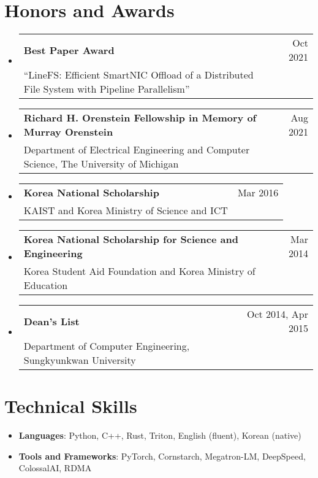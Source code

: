 \documentclass[letterpaper,oneside,11pt]{article}
\makeatletter
\newcommand{\resumeItem}[2]{
  \item\small{
    \textbf{#1}{: #2 \vspace{-3pt}}
  }
}
\newcommand{\resumeSubheading}[4]{
  \vspace{-1pt}\item
    \begin{tabularx}{0.97\textwidth}[t]{X@{\hspace{20pt}}r}
      \textbf{#1} & #2 \\
      \small#3 & \small #4 \\
    \end{tabularx}\vspace{-3pt}
}
\newcommand{\resumeSubHeadingListStart}{\begin{itemize}[leftmargin=*]}
\newcommand{\resumeSubHeadingListEnd}{\end{itemize}}
\makeatother
\begin{document}
\section{Honors and Awards}
  \resumeSubHeadingListStart
    \resumeSubheading{Best Paper Award}{Oct 2021}
    {``LineFS: Efficient SmartNIC Offload of a Distributed File System with Pipeline Parallelism''}{}
    \resumeSubheading{Richard H. Orenstein Fellowship in Memory of Murray Orenstein}{Aug 2021}
    {Department of Electrical Engineering and Computer Science, The University of Michigan}{}
    \resumeSubheading{Korea National Scholarship}{Mar 2016}
    {KAIST and Korea Ministry of Science and ICT}{}
    \resumeSubheading{Korea National Scholarship for Science and Engineering}
    {Mar 2014}
    {Korea Student Aid Foundation and Korea Ministry of Education}{}
    \resumeSubheading{Dean's List}{Oct 2014, Apr 2015}
    {Department of Computer Engineering, Sungkyunkwan University}{}
  \resumeSubHeadingListEnd

%
\section{Technical Skills}
 \resumeSubHeadingListStart
  \resumeItem{Languages}{Python, C++, Rust, Triton, English (fluent), Korean (native)}
  \resumeItem{Tools and Frameworks}{PyTorch, Cornstarch, Megatron-LM, DeepSpeed, ColossalAI, RDMA}
 \resumeSubHeadingListEnd

\end{document}
